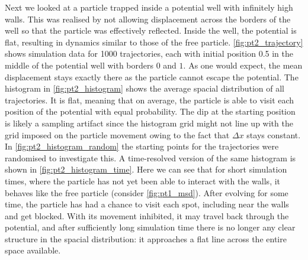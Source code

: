 \documentclass[
    parskip=half, 
    twoside=false,
    twocolumn=true,
    fontsize=11pt,
]{scrarticle}
\begin{document}
Next we looked at a particle trapped inside a potential well with infinitely high walls. This was realised by not allowing displacement across the borders of the well so that the particle was effectively reflected. Inside the well, the potential is flat, resulting in dynamics similar to those of the free particle. \autoref{fig:pt2_trajectory} shows simulation data for \SI{1000}{} trajectories, each with initial position \SI{0.5}{} in the middle of the potential well with borders $0$ and $1$. As one would expect, the mean displacement stays exactly there as the particle cannot escape the potential. The histogram in \autoref{fig:pt2_histogram} shows the average spacial distribution of all trajectories. It is flat, meaning that on average, the particle is able to visit each position of the potential with equal probability. The dip at the starting position is likely a sampling artifact since the histogram grid might not line up with the grid imposed on the particle movement owing to the fact that $\Delta x$ stays constant. In \autoref{fig:pt2_histogram_random} the starting points for the trajectories were randomised to investigate this. A time-resolved version of the same histogram is shown in \autoref{fig:pt2_histogram_time}. Here we can see that for short simulation times, where the particle has not yet been able to interact with the walls, it behaves like the free particle (consider \autoref{fig:pt1_msd}). After evolving for some time, the particle has had a chance to visit each spot, including near the walls and get blocked. With its movement inhibited, it may travel back through the potential, and after sufficiently long simulation time there is no longer any clear structure in the spacial distribution: it approaches a flat line across the entire space available.
\end{document}
